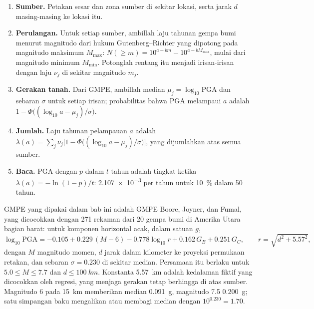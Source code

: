 \begin{method}\label{met:b2:geological-hazards:psha}
\begin{enumerate}
  \item \textbf{Sumber.} Petakan sesar dan zona sumber di sekitar lokasi, serta jarak $d$ masing-masing
        ke lokasi itu.
  \item \textbf{Perulangan.} Untuk setiap sumber, ambillah laju tahunan gempa bumi menurut magnitudo
        dari hukum Gutenberg--Richter yang dipotong pada magnitudo maksimum $M_{\max}$:
        $N(\geq m) = 10^{a - bm} - 10^{a - bM_{\max}}$, mulai dari magnitudo minimum $M_{\min}$.
        Potonglah rentang itu menjadi irisan-irisan dengan laju $\nu_j$ di sekitar magnitudo $m_j$.
  \item \textbf{Gerakan tanah.} Dari GMPE, ambillah median $\mu_j = \log_{10}\mathrm{PGA}$ dan
        sebaran $\sigma$ untuk setiap irisan; probabilitas bahwa PGA melampaui $a$ adalah
        $1 - \Phi\bigl((\log_{10} a - \mu_j)/\sigma\bigr)$.
  \item \textbf{Jumlah.} Laju tahunan pelampauan $a$ adalah $\lambda(a) = \sum_j \nu_j
        \bigl[1 - \Phi\bigl((\log_{10} a - \mu_j)/\sigma\bigr)\bigr]$, yang dijumlahkan atas semua sumber.
  \item \textbf{Baca.} PGA dengan  $p$ dalam $t$ tahun adalah tingkat ketika
        $\lambda(a) = -\ln(1 - p)/t$: \num{2.107e-3} per tahun untuk \qty{10}{\percent} dalam 50 tahun.
\end{enumerate}
\end{method}

GMPE yang dipakai dalam bab ini adalah GMPE Boore, Joyner, dan Fumal, yang dicocokkan dengan 271 rekaman dari 20
gempa bumi di Amerika Utara bagian barat: untuk komponen horizontal acak, dalam satuan $g$,
\begin{equation}
\log_{10}\mathrm{PGA} = -0.105 + 0.229\,(M - 6) - 0.778\log_{10} r + 0.162\,G_B + 0.251\,G_C,
\qquad r = \sqrt{d^2 + 5.57^2},
\label{eq:b2:geological-hazards:gmpe}
\end{equation}
dengan $M$ magnitudo momen, $d$ jarak dalam kilometer ke proyeksi permukaan
retakan, dan sebaran $\sigma = 0.230$ di sekitar median. Persamaan itu berlaku untuk $5.0 \leq M \leq 7.7$ dan $d
\leq \qty{100}{km}$. Konstanta \qty{5.57}{km} adalah kedalaman fiktif yang dicocokkan oleh regresi,
yang menjaga gerakan tetap berhingga di atas sumber. Magnitudo 6 pada \qty{15}{km} memberikan median
\qty{0.091}{g}, magnitudo 7.5 \qty{0.200}{g}; satu simpangan baku mengalikan atau membagi
median dengan $10^{0.230} = 1.70$.

